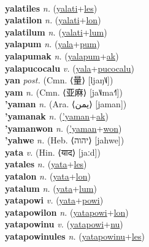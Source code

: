  \label{yalati} \\
\textbf{yalatiles} \textit{n.} (\hyperref[yalati]{yalati}+\hyperref[les]{les})
 \label{yalatiles} \\
\textbf{yalatilon} \textit{n.} (\hyperref[yalati]{yalati}+\hyperref[lon]{lon})
 \label{yalatilon} \\
\textbf{yalatilum} \textit{n.} (\hyperref[yalati]{yalati}+\hyperref[lum]{lum})
 \label{yalatilum} \\
\textbf{yalapum} \textit{n.} (\hyperref[yala]{yala}+\hyperref[pum]{pum})
 \label{yalapum} \\
\textbf{yalapumak} \textit{n.} (\hyperref[yalapum]{yalapum}+\hyperref[ak]{ak})
 \label{yalapumak} \\
\textbf{yalapucocalu} \textit{v.} (\hyperref[yala]{yala}+\hyperref[pucocalu]{pucocalu})
 \label{yalapucocalu} \\
\textbf{yan} \textit{post.} (Cmn. ⟨量⟩ [ljaŋ˥˩])
 \label{yan} \\
\textbf{yam} \textit{n.} (Cmn. ⟨亚麻⟩ [ja˥˩ma˧˥])
 \label{yam} \\
\textbf{'yaman} \textit{n.} (Ara. ⟨يمن⟩ [jaman])
 \label{'yaman} \\
\textbf{'yamanak} \textit{n.} (\hyperref['yaman]{'yaman}+\hyperref[ak]{ak})
 \label{'yamanak} \\
\textbf{'yamanwon} \textit{n.} (\hyperref['yaman]{'yaman}+\hyperref[won]{won})
 \label{'yamanwon} \\
\textbf{'yahwe} \textit{n.} (Heb. ⟨יהוה‬⟩ [jahwe])
 \label{'yahwe} \\
\textbf{yata} \textit{v.} (Hin. ⟨याद⟩ [jaːd])
 \label{yata} \\
\textbf{yatales} \textit{n.} (\hyperref[yata]{yata}+\hyperref[les]{les})
 \label{yatales} \\
\textbf{yatalon} \textit{n.} (\hyperref[yata]{yata}+\hyperref[lon]{lon})
 \label{yatalon} \\
\textbf{yatalum} \textit{n.} (\hyperref[yata]{yata}+\hyperref[lum]{lum})
 \label{yatalum} \\
\textbf{yatapowi} \textit{v.} (\hyperref[yata]{yata}+\hyperref[powi]{powi})
 \label{yatapowi} \\
\textbf{yatapowilon} \textit{n.} (\hyperref[yatapowi]{yatapowi}+\hyperref[lon]{lon})
 \label{yatapowilon} \\
\textbf{yatapowinu} \textit{v.} (\hyperref[yatapowi]{yatapowi}+\hyperref[nu]{nu})
 \label{yatapowinu} \\
\textbf{yatapowinules} \textit{n.} (\hyperref[yatapowinu]{yatapowinu}+\hyperref[les]{les})
